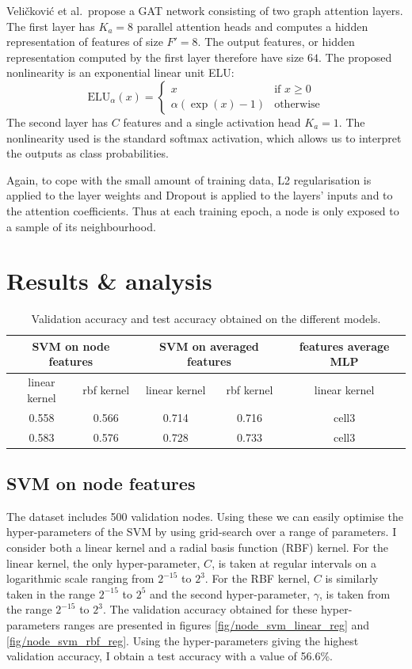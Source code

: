 \documentclass[12pt]{article}
\theoremstyle{definition}
\begin{document}
\bigskip

Veli{\v{c}}kovi{\'{c}} et al.\ propose a GAT network consisting of two graph attention layers. The first layer has $K_a=8$ parallel attention heads and computes a hidden representation of features of size $F'=8$. The output features, or hidden representation computed by the first layer therefore have size $64$. The proposed nonlinearity is an exponential linear unit ELU:
\[
\textrm{ELU}_{\alpha}(x) = 
	\begin{cases}
		x &\text{if $x \ge 0$}\\
		\alpha (\exp(x) - 1) &\text{otherwise}
	\end{cases}
\]
The second layer has $C$ features and a single activation head $K_a=1$. The nonlinearity used is the standard softmax activation, which allows us to interpret the outputs as class probabilities.

Again, to cope with the small amount of training data, L2 regularisation is applied to the layer weights and Dropout \cite{srivastava2014dropout} is applied to the layers' inputs and to the attention coefficients. Thus at each training epoch, a node is only exposed to a sample of its neighbourhood. 

\section{Results \& analysis}

\begin{table}[h]
\centering	
\begin{tabular}{ |c|c|c|c|c| } 
 \hline
 \multicolumn{2}{|c|}{SVM on node features} & \multicolumn{2}{|c|}{SVM on averaged features} & features average MLP \\
 \hline
 linear kernel & rbf kernel & linear kernel & rbf kernel & linear kernel \\
 \hline
 \hline
 0.558 &  0.566 & 0.714 & 0.716 & cell3 \\ 
 0.583 &  0.576 & 0.728 & 0.733 & cell3 \\ 
 \hline
\end{tabular}
\caption{Validation accuracy and test accuracy obtained on the different models.}
\end{table}

\subsection{SVM on node features}
The dataset includes 500 validation nodes. Using these we can easily optimise the hyper-parameters of the SVM by using grid-search over a range of parameters. I consider both a linear kernel and a radial basis function (RBF) kernel. For the linear kernel, the only hyper-parameter, $C$, is taken at regular intervals on a logarithmic scale ranging from $2^{-15}$ to $2^3$. For the RBF kernel, $C$ is similarly taken in the range $2^{-15}$ to $2^5$ and the second hyper-parameter, $\gamma$, is taken from the range $2^{-15}$ to $2^3$. The validation accuracy obtained for these hyper-parameters ranges are presented in figures \ref{fig/node_svm_linear_reg} and \ref{fig/node_svm_rbf_reg}. Using the hyper-parameters giving the highest validation accuracy, I obtain a test accuracy with a value of 56.6\%. 
\end{document}

